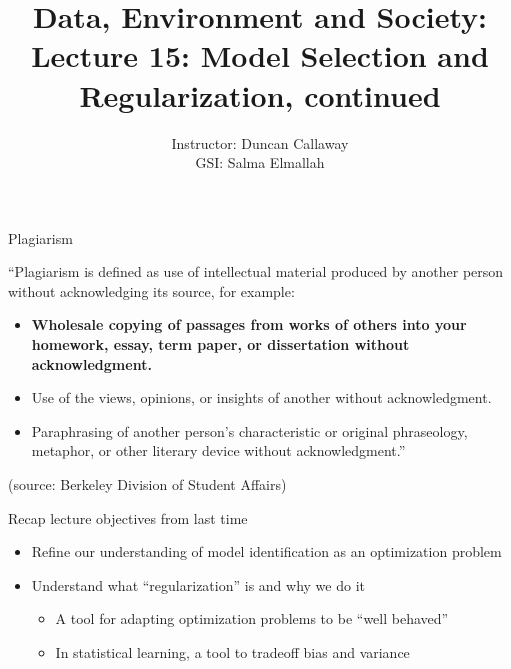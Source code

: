 \documentclass[mathserif, aspectratio=169]{beamer}
\title[Lecture 15] %
{Data, Environment and Society: \\{Lecture 15: Model Selection and Regularization, continued}}
\author[ER190C: Data, Environment and Society] 
{Instructor: Duncan Callaway\\
GSI: Salma Elmallah}
\institute[UC Berkeley] %
 {\small{ \bf October 22, 2019}}
\date[October 22, 2019]
\begin{document}
\frame{
  \titlepage
}

\begin{frame}{Plagiarism}

``Plagiarism is defined as use of intellectual material produced by another person without acknowledging its source, for example:
 
\begin{itemize}
	\item \textbf{Wholesale copying of passages from works of others into your homework, essay, term paper, or dissertation without acknowledgment.}
	\item Use of the views, opinions, or insights of another without acknowledgment.
	\item Paraphrasing of another person’s characteristic or original phraseology, metaphor, or other literary device without acknowledgment.''
\end{itemize}
 (source: Berkeley Division of Student Affairs)
\end{frame}

\begin{frame}{Recap lecture objectives from last time}
\begin{itemize}
\item Refine our understanding of model identification as an optimization problem
\item<4-> Understand what ``regularization'' is and why we do it
\begin{itemize}
\item<5-> A tool for adapting optimization problems to be ``well behaved''
\item<5-> In statistical learning, a tool to tradeoff bias and variance
\end{itemize}

\end{itemize}
\end{frame}
\end{document}
